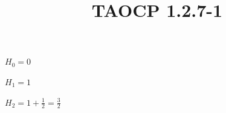 \documentclass{article}
\title{TAOCP 1.2.7\mbox{-}1}
\begin{document}
\maketitle

\( H_{0} = 0 \)

\( H_{1} = 1 \)

\( H_{2} = 1 + \frac{1}{2} = \frac{3}{2} \)
\end{document}
